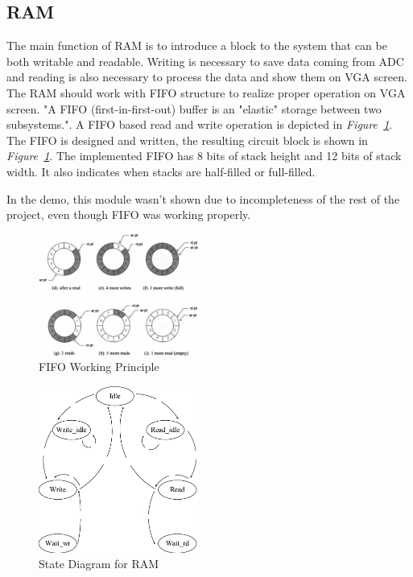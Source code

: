 \documentclass[paper]{IEEEtran}
\begin{document}
\subsection{RAM} \- \indent
	The main function of RAM is to introduce a block to the system that can be both writable and readable. Writing is necessary to save data coming from ADC and reading is also necessary to process the data and show them on VGA screen. The RAM should work with FIFO structure to realize proper operation on VGA screen. "A FIFO (first-in-first-out) buffer is an "elastic" storage between two subsystems."\cite{b3}. A FIFO based read and write operation is depicted in \textit{Figure~\ref{fig:fifo_diagram}}. The FIFO is designed and written, the resulting circuit block is shown in \textit{Figure~\ref{fig:fifo_diagram}}. The implemented FIFO has 8 bits of stack height and 12 bits of stack width. It also indicates when stacks are half-filled or full-filled.
	
	In the demo, this module wasn't shown due to incompleteness of the rest of the project, even though FIFO was working properly.
	
	\begin{figure}[t!]
		\setlength{\unitlength}{\textwidth}
		\center 
		\includegraphics[width=0.47\textwidth]{fifo_diagram}
		\caption{\label{fig:fifo_diagram}FIFO Working Principle\cite{b3}}
	\end{figure}

\begin{figure}[h!]
			\setlength{\unitlength}{\textwidth}
			\center 
			\includegraphics[width=0.47\textwidth]{RAM_state}
			\caption{\label{fig:RAM State} State Diagram for RAM}
\end{figure}
\end{document}

